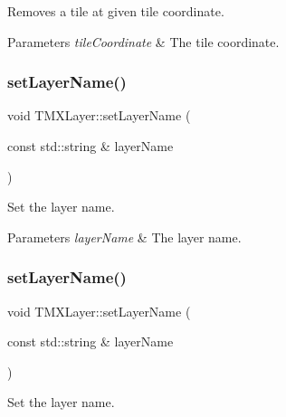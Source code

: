 Removes a tile at given tile coordinate.


\begin{DoxyParams}{Parameters}
{\em tile\+Coordinate} & The tile coordinate. \\
\hline
\end{DoxyParams}
\mbox{\label{classTMXLayer_a41ce08785e388b65e0f994781f45183d}} 
\subsubsection{\texorpdfstring{set\+Layer\+Name()}{setLayerName()}\hspace{0.1cm}{\footnotesize\ttfamily [1/2]}}
{\footnotesize\ttfamily void T\+M\+X\+Layer\+::set\+Layer\+Name (\begin{DoxyParamCaption}\item[{const std\+::string \&}]{layer\+Name }\end{DoxyParamCaption})\hspace{0.3cm}{\ttfamily [inline]}}

Set the layer name.


\begin{DoxyParams}{Parameters}
{\em layer\+Name} & The layer name. \\
\hline
\end{DoxyParams}
\mbox{\label{classTMXLayer_a41ce08785e388b65e0f994781f45183d}} 
\subsubsection{\texorpdfstring{set\+Layer\+Name()}{setLayerName()}\hspace{0.1cm}{\footnotesize\ttfamily [2/2]}}
{\footnotesize\ttfamily void T\+M\+X\+Layer\+::set\+Layer\+Name (\begin{DoxyParamCaption}\item[{const std\+::string \&}]{layer\+Name }\end{DoxyParamCaption})\hspace{0.3cm}{\ttfamily [inline]}}

Set the layer name.



